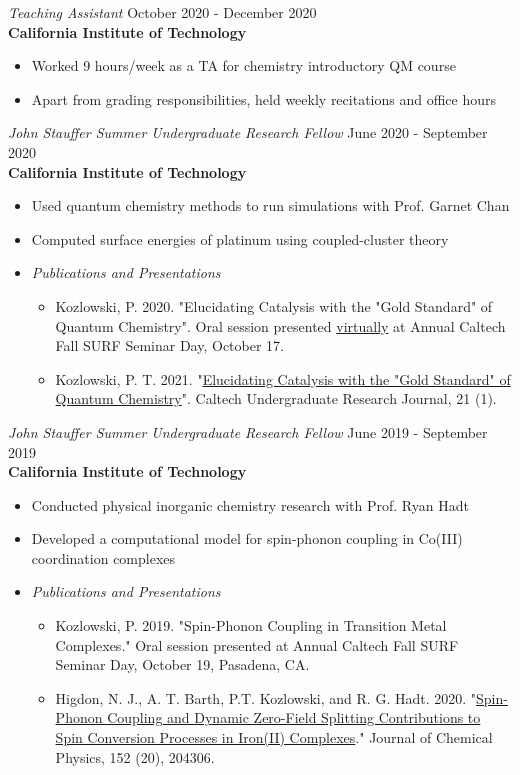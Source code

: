 \documentclass[margin,line]{resume}
\begin{document}
\begin{resume}
{\sl Teaching Assistant} \hfill October 2020 - December 2020\\
\textbf{California Institute of Technology}
\begin{itemize}
\item Worked 9 hours/week as a TA for chemistry introductory QM course
\item Apart from grading responsibilities, held weekly recitations and office hours
\end{itemize}
{\sl John Stauffer Summer Undergraduate Research Fellow} \hfill June 2020 - September 2020 \\
\textbf{California Institute of Technology}
\begin{itemize}
\item Used quantum chemistry methods to run simulations with Prof. Garnet Chan
\item Computed surface energies of platinum using coupled-cluster theory
\item \emph{Publications and Presentations}
    \begin{itemize}
        \item Kozlowski, P. 2020. "Elucidating Catalysis with the "Gold Standard" of Quantum Chemistry". Oral session presented \href{https://youtu.be/pcNnGM0bYRw}{virtually} at Annual Caltech Fall SURF Seminar Day, October 17.
        \item Kozlowski, P. T. 2021. "\href{https://curj.caltech.edu/2021/06/29/elucidating-catalysis-with-the-gold-standard-of-quantum-chemistry/}{Elucidating Catalysis with the "Gold Standard" of Quantum Chemistry}". Caltech Undergraduate Research Journal, 21 (1).
    \end{itemize}
\end{itemize} 
{\sl John Stauffer Summer Undergraduate Research Fellow} \hfill June 2019 - September 2019 \\
\textbf{California Institute of Technology}
\begin{itemize}
\item Conducted physical inorganic chemistry research with Prof. Ryan Hadt
\item Developed a computational model for spin-phonon coupling in Co(III)
coordination complexes
\item \emph{Publications and Presentations}
    \begin{itemize}
            \item Kozlowski, P. 2019. "Spin-Phonon Coupling in Transition Metal Complexes." Oral session presented at Annual Caltech Fall SURF Seminar Day, October 19, Pasadena, CA.
    \item Higdon, N. J., A. T. Barth, P.T. Kozlowski, and R. G. Hadt. 2020. "\href{https://doi.org/10.1063/5.0006361}{Spin-Phonon Coupling and Dynamic Zero-Field Splitting Contributions to Spin Conversion Processes in Iron(II) Complexes}." Journal of Chemical Physics, 152 (20), 204306.
    \end{itemize}
\end{itemize}

\end{resume}
\end{document}
